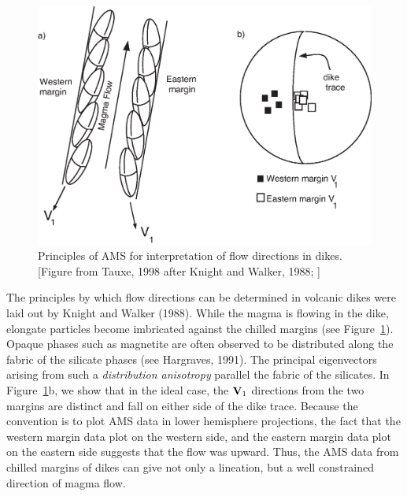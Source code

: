 \begin{figure}[htb]
\centering  \includegraphics[width=12 cm]{EPSfiles/dikeams.eps}
\caption{Principles of AMS for interpretation of flow directions in dikes. [Figure from Tauxe, 1998 after 
Knight and Walker, 1988; ]}
\label{fig:dikeams}
\end{figure} \nocite{knight88,tauxe98} 

The principles by which flow directions can be determined in volcanic dikes
were laid out by  
Knight and Walker (1988). \nocite{knight88} 
While the magma is flowing in the
dike, elongate particles 
 become imbricated against the chilled margins (see Figure~\ref{fig:dikeams}).
Opaque phases such as magnetite are often observed to be 
distributed along the fabric of 
the silicate phases (see 
 Hargraves, 1991).\nocite{hargraves91} 
The principal eigenvectors arising from such a
{\it distribution anisotropy} parallel the  fabric of the silicates.
 In Figure~\ref{fig:dikeams}b,
we show that in the ideal case,
the $\hbox{\bf V}_1$ directions from the two margins are distinct and 
fall on either side of the dike trace.  Because the convention is to plot AMS
data in lower hemisphere projections, the fact that the western margin data
plot on the western side, and the eastern margin data plot on the eastern side
suggests that the flow was upward.  Thus, the AMS data from 
chilled margins of dikes can give not only a lineation, but a well constrained
direction of magma flow. 


